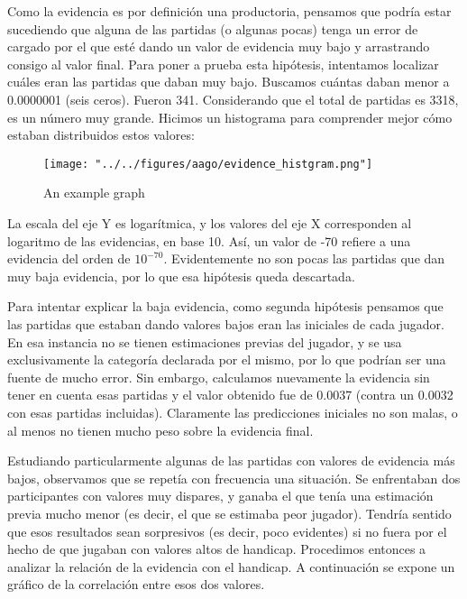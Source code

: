 \documentclass[a4paper,10pt]{report}
\begin{document}
Como la evidencia es por definición una productoria, pensamos que podría estar sucediendo que alguna de las partidas (o algunas pocas) tenga un error de cargado por el que esté dando un valor de evidencia muy bajo y arrastrando consigo al valor final.
Para poner a prueba esta hipótesis, intentamos localizar cuáles eran las partidas que daban muy bajo.
Buscamos cuántas daban menor a 0.0000001 (seis ceros).
Fueron 341.
Considerando que el total de partidas es 3318, es un número muy grande.
Hicimos un histograma para comprender mejor cómo estaban distribuidos estos valores:

\begin{figure}
	\centering
	\texttt{[image: "../../figures/aago/evidence\_histgram.png"]}
	\caption{An example graph}
	\label{fig:aago-hist}
\end{figure}

La escala del eje Y es logarítmica, y los valores del eje X corresponden al logaritmo de las evidencias, en base 10. Así, un valor de -70 refiere a una evidencia del orden de $10^{-70}$.
Evidentemente no son pocas las partidas que dan muy baja evidencia, por lo que esa hipótesis queda descartada.

Para intentar explicar la baja evidencia, como segunda hipótesis pensamos que las partidas que estaban dando valores bajos eran las iniciales de cada jugador.
En esa instancia no se tienen estimaciones previas del jugador, y se usa exclusivamente la categoría declarada por el mismo, por lo que podrían ser una fuente de mucho error.
Sin embargo, calculamos nuevamente la evidencia sin tener en cuenta esas partidas y el valor obtenido fue de 0.0037 (contra un 0.0032 con esas partidas incluidas).
Claramente las predicciones iniciales no son malas, o al menos no tienen mucho peso sobre la evidencia final.

Estudiando particularmente algunas de las partidas con valores de evidencia más bajos, observamos que se repetía con frecuencia una situación.
Se enfrentaban dos participantes con valores muy dispares, y ganaba el que tenía una estimación previa mucho menor (es decir, el que se estimaba peor jugador).
Tendría sentido que esos resultados sean sorpresivos (es decir, poco evidentes) si no fuera por el hecho de que jugaban con valores altos de handicap.
Procedimos entonces a analizar la relación de la evidencia con el handicap.
A continuación se expone un gráfico de la correlación entre esos dos valores.
\end{document}
